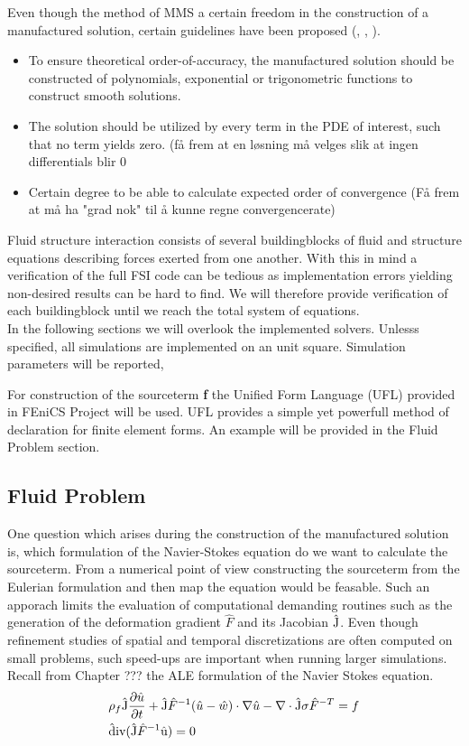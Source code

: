 Even though the method of MMS a certain freedom in the construction of a manufactured solution, certain guidelines have been proposed  (\cite{Steinberg1985}, \cite{Biggs}, \cite{Roache2002} ). 

\begin{itemize}
\item To ensure theoretical order-of-accuracy, the manufactured solution should be constructed of polynomials, exponential or trigonometric functions to construct smooth solutions.
\item The solution should be utilized by every term in the PDE of interest, such that no term yields zero.
(få frem at en løsning må velges slik at ingen differentials blir 0
\item Certain degree to be able to calculate expected order of convergence (Få frem at må ha "grad nok" til å kunne regne convergencerate) 
\end{itemize}

Fluid structure interaction consists of several buildingblocks of fluid and structure equations describing forces exerted from one another. With this in mind a verification of the full FSI code can be tedious as implementation errors yielding non-desired results can be hard to find. We will therefore provide verification of each buildingblock until we reach the total system of equations. \\

In the following sections we will overlook the implemented solvers. Unlesss specified, all simulations are implemented on an unit square. Simulation parameters will be reported, 

For construction of the sourceterm \textbf{f} the Unified Form Language (UFL) \cite{Project2016} provided in FEniCS Project will be used. UFL provides a simple yet powerfull method of declaration for finite element forms. An example will be provided in the Fluid Problem section. 

\subsection{Fluid Problem}
One question which arises during the construction of the manufactured solution is, which formulation of the Navier-Stokes equation do we want to calculate the sourceterm. From a numerical point of view constructing the sourceterm from the Eulerian formulation and then map the equation would be feasable. Such an apporach limits the evaluation of computational demanding routines such as the generation of the deformation gradient $\hat{F}$ and its Jacobian $\text{\^{J}}$. Even though refinement studies of spatial and temporal discretizations are often computed on small problems, such speed-ups are important when running larger simulations. 
Recall from Chapter ??? the ALE formulation of the Navier Stokes equation. 
\begin{align*}
&\rho_f \text{\^{J}}\frac{\partial \hat{u}}{\partial t} + \text{\^{J}} \hat{F}^{-1} (\hat{u} - \hat{w})\cdot \nabla \hat{u} 
- \nabla \cdot \text{\^{J}} \sigma \hat{F}^{-T} = f \\
&\text{\^{div}}(\text{\^{J}}\hat{F}^{-1}\text{\^{u}}) = 0
\end{align*}



